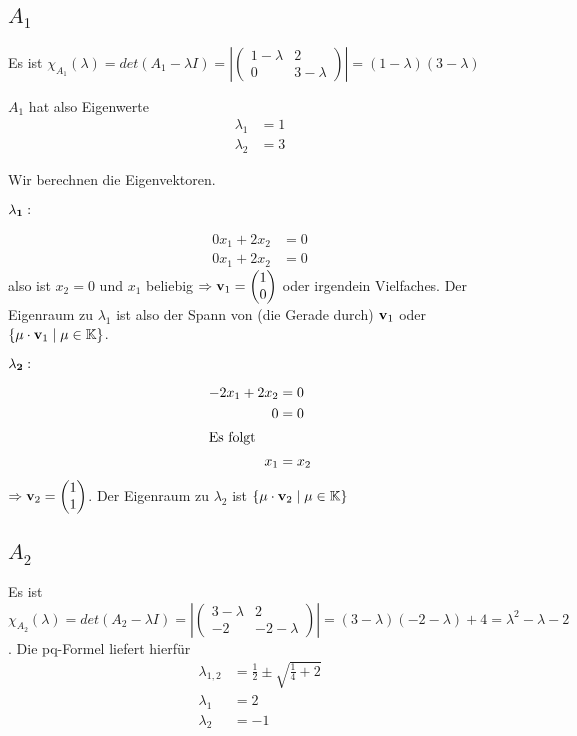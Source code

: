 \documentclass{../mfa}
\begin{document}
\section{}
\subsection{$A_1$}

Es ist $\chi_{A_1}(\lambda) = det(A_1 - \lambda I) = 
\left|
\begin{pmatrix}
   1-\lambda & 2 \\
   0 & 3 - \lambda
\end{pmatrix}
\right|= (1-\lambda)(3-\lambda)$

$A_1$ hat also Eigenwerte 
\begin{align*}
   \lambda_1 &= 1 \\
   \lambda_2 &= 3 
\end{align*}

Wir berechnen die Eigenvektoren.

$\mathbf{\lambda_1:}$
\par 
\begin{align*}
   0x_1 + 2x_2 &= 0 \\
   0x_1 + 2x_2 &= 0
\end{align*}
also ist $x_2 = 0$ und $x_1$ beliebig $\Rightarrow \v{1} = \begin{pmatrix} 1 \\
0 \end{pmatrix}$ oder irgendein Vielfaches. Der Eigenraum zu $\lambda_1$ ist
also der Spann von (die Gerade durch) $\v{1}$ oder $\{\mu \cdot \v{1} \mid \mu
\in \mathbb{K}\}$.

$\mathbf{\lambda_2:}$
\par 
\begin{align*}
   -2x_1 + 2x_2 &= 0 \\
   0          &= 0 \\
   \intertext{Es folgt}
   x_1        &= x_2
\end{align*}
$\Rightarrow \v{2} = \begin{pmatrix} 1 \\ 1 \end{pmatrix}$. Der Eigenraum zu
   $\lambda_2$ ist $\{\mu \cdot \v{2} \mid \mu \in \mathbb{K}\}$

\subsection{$A_2$}

Es ist $\chi_{A_2}(\lambda) = det(A_2 - \lambda I) = 
\left|
\begin{pmatrix}
   3-\lambda & 2 \\
   -2 & -2 - \lambda
\end{pmatrix}
\right|= (3 - \lambda)(-2 - \lambda) + 4 = \lambda^2 - \lambda -2$. Die
pq-Formel liefert hierfür
\begin{align*}
   \lambda_{1,2} & = \frac{1}{2} \pm \sqrt{\frac{1}{4} + 2} \\
   \lambda_1     & = 2                                        \\
   \lambda_2     & = -1                                       \\
\end{align*}
\end{document}
